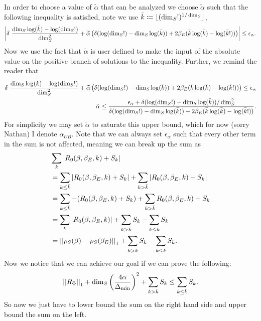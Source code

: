 \documentclass{article}
\newcommand{\parens}[1]{\left( #1 \right)}
\newcommand{\abs}[1]{\left| #1 \right|}
\newcommand{\norm}[1]{\left| \left| #1 \right| \right|}
\begin{document}
In order to choose a value of $\widetilde{\alpha}$ that can be analyzed we choose $\widetilde{\alpha}$ such that the following inequality is satisfied, note we use $\Bar{k} \coloneqq \lfloor (\dim_S!)^{1/\dim_S} \rfloor$,
\begin{align}
\abs{\delta ~\frac{\dim_S \log(\Bar{k}) - \log (\dim_S !)}{\dim_S^2} + \widetilde{\alpha} \parens{\delta (\log(\dim_S!) - \dim_S \log(\Bar{k})) + 2 \beta_E (\Bar{k} \log (\Bar{k}) - \log(\Bar{k}!))}} \leq \epsilon_\alpha.
\end{align}
Now we use the fact that $\widetilde{\alpha}$ is user defined to make the input of the absolute value on the positive branch of solutions to the inequality. Further, we remind the reader that 
\begin{align}
    \delta ~\frac{\dim_S \log(\Bar{k}) - \log (\dim_S !)}{\dim_S^2} + \widetilde{\alpha} \parens{\delta (\log(\dim_S!) - \dim_S \log(\Bar{k})) + 2 \beta_E (\Bar{k} \log (\Bar{k}) - \log(\Bar{k}!))} \leq \epsilon_\alpha \\
    \widetilde{\alpha} \leq \frac{ \epsilon_{\alpha} + \delta (\log (\dim_S!) - \dim_S \log(\Bar{k})) / \dim_S^2}{\delta (\log(\dim_S!) - \dim_S \log(\Bar{k})) + 2 \beta_E (\Bar{k} \log (\Bar{k}) - \log(\Bar{k}!))}.
\end{align}
For simplicity we may set $\widetilde{\alpha}$ to saturate this upper bound, which for now (sorry Nathan) I denote $\alpha_{UB}$. Note that we can always set $\epsilon_{\alpha}$ such that every other term in the sum is not affected, meaning we can break up the sum as
\begin{align}
    &\sum_k |R_0(\beta, \beta_E, k) + S_k| \\
    &= \sum_{k \leq \Bar{k}} |R_0(\beta, \beta_E, k) + S_k | + \sum_{k > \Bar{k}} |R_0(\beta, \beta_E, k) + S_k | \\
    &= \sum_{k \leq \Bar{k}} -(R_0(\beta, \beta_E, k) + S_k) + \sum_{k > \Bar{k}} R_0(\beta, \beta_E, k) + S_k \\
    &= \sum_k |R_0(\beta, \beta_E, k)| + \sum_{k > \Bar{k}} S_k - \sum_{k \leq \Bar{k}} S_k \\ 
    &= \norm{\rho_S(\beta) - \rho_S(\beta_E)}_1 + \sum_{k > \Bar{k}} S_k - \sum_{k \leq \Bar{k}} S_k.
\end{align}
Now we notice that we can achieve our goal if we can prove the following:
\begin{align}
    \norm{R_\Phi}_1 + \dim_S \parens{\frac{4\alpha}{\Delta_{\min}}}^2 + \sum_{k > \Bar{k}} S_k \leq \sum_{k \leq \Bar{k}} S_k.
\end{align}
So now we just have to lower bound the sum on the right hand side and upper bound the sum on the left.
\end{document}
